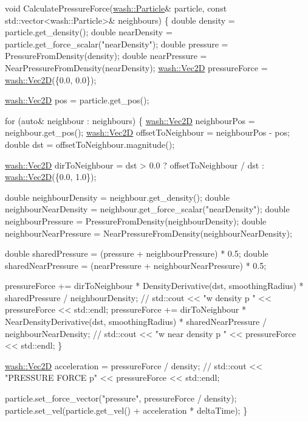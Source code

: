 \begin{DoxyCode}
\textcolor{keywordtype}{void} CalculatePressureForce(\mbox{\hyperlink{classwash_1_1Particle}{wash::Particle}}& particle, \textcolor{keyword}{const} std::vector<wash::Particle>& 
      neighbours) \{
    \textcolor{keywordtype}{double} density = particle.get\_density();
    \textcolor{keywordtype}{double} nearDensity = particle.get\_force\_scalar(\textcolor{stringliteral}{"nearDensity"});
    \textcolor{keywordtype}{double} pressure = PressureFromDensity(density);
    \textcolor{keywordtype}{double} nearPressure = NearPressureFromDensity(nearDensity);
    \mbox{\hyperlink{classwash_1_1Vec}{wash::Vec2D}} pressureForce = \mbox{\hyperlink{classwash_1_1Vec}{wash::Vec2D}}(\{0.0, 0.0\});

    \mbox{\hyperlink{classwash_1_1Vec}{wash::Vec2D}} pos = particle.get\_pos();

    \textcolor{keywordflow}{for} (\textcolor{keyword}{auto}& neighbour : neighbours) \{
        \mbox{\hyperlink{classwash_1_1Vec}{wash::Vec2D}} neighbourPos = neighbour.get\_pos();
        \mbox{\hyperlink{classwash_1_1Vec}{wash::Vec2D}} offsetToNeighbour = neighbourPos - pos;
        \textcolor{keywordtype}{double} dst = offsetToNeighbour.magnitude();

        \mbox{\hyperlink{classwash_1_1Vec}{wash::Vec2D}} dirToNeighbour = dst > 0.0 ? offsetToNeighbour / dst : 
      \mbox{\hyperlink{classwash_1_1Vec}{wash::Vec2D}}(\{0.0, 1.0\});

        \textcolor{keywordtype}{double} neighbourDensity = neighbour.get\_density();
        \textcolor{keywordtype}{double} neighbourNearDensity = neighbour.get\_force\_scalar(\textcolor{stringliteral}{"nearDensity"});
        \textcolor{keywordtype}{double} neighbourPressure = PressureFromDensity(neighbourDensity);
        \textcolor{keywordtype}{double} neighbourNearPressure = NearPressureFromDensity(neighbourNearDensity);

        \textcolor{keywordtype}{double} sharedPressure = (pressure + neighbourPressure) * 0.5;
        \textcolor{keywordtype}{double} sharedNearPressure = (nearPressure + neighbourNearPressure) * 0.5;

        pressureForce += dirToNeighbour * DensityDerivative(dst, smoothingRadius) * sharedPressure / 
      neighbourDensity;
        \textcolor{comment}{// std::cout << "w density p " << pressureForce << std::endl;}
        pressureForce +=
            dirToNeighbour * NearDensityDerivative(dst, smoothingRadius) * sharedNearPressure / 
      neighbourNearDensity;
        \textcolor{comment}{// std::cout << "w near density p " << pressureForce << std::endl;}
    \}

    \mbox{\hyperlink{classwash_1_1Vec}{wash::Vec2D}} acceleration = pressureForce / density;
    \textcolor{comment}{// std::cout << "PRESSURE FORCE p" << pressureForce << std::endl;}

    particle.set\_force\_vector(\textcolor{stringliteral}{"pressure"}, pressureForce / density);
    particle.set\_vel(particle.get\_vel() + acceleration * deltaTime);
\}
\end{DoxyCode}



